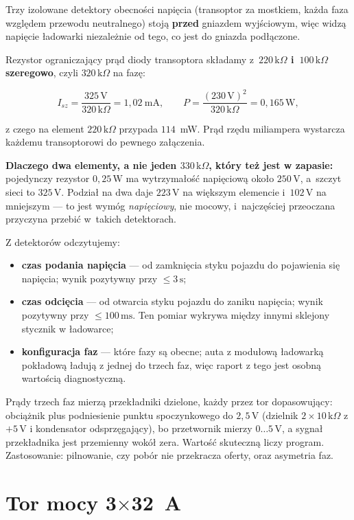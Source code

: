\documentclass[a4paper,11pt]{article}
\newcommand{\kohm}{\,\mathrm{k}\Omega}
\newcommand{\volt}{\,\mathrm{V}}
\newcommand{\watt}{\,\mathrm{W}}
\newcommand{\ms}{\,\mathrm{ms}}
\newcommand{\sek}{\,\mathrm{s}}
\begin{document}
Trzy izolowane detektory obecności napięcia (transoptor za mostkiem, każda faza
względem przewodu neutralnego) stoją \textbf{przed} gniazdem wyjściowym, więc widzą
napięcie ładowarki niezależnie od tego, co jest do gniazda podłączone.

Rezystor ograniczający prąd diody transoptora składamy z~\textbf{$220\kohm$
i~$100\kohm$ szeregowo}, czyli $320\kohm$ na fazę:

\[
I_{sz}=\frac{325\volt}{320\kohm}=1{,}02\ \mathrm{mA},
\qquad
P=\frac{(230\volt)^2}{320\kohm}=0{,}165\watt,
\]

z czego na element $220\kohm$ przypada $114$~mW. Prąd rzędu miliampera wystarcza
każdemu transoptorowi do pewnego załączenia.

\textbf{Dlaczego dwa elementy, a nie jeden $330\kohm$, który też jest w zapasie:}
pojedynczy rezystor $0{,}25\watt$ ma wytrzymałość napięciową około $250\volt$,
a~szczyt sieci to $325\volt$. Podział na dwa daje $223\volt$ na większym elemencie
i~$102\volt$ na mniejszym --- to jest wymóg \emph{napięciowy}, nie mocowy,
i~najczęściej przeoczana przyczyna przebić w~takich detektorach.

Z detektorów odczytujemy:

\begin{itemize}
\item \textbf{czas podania napięcia} --- od zamknięcia styku pojazdu do pojawienia
      się napięcia; wynik pozytywny przy $\le3\sek$;
\item \textbf{czas odcięcia} --- od otwarcia styku pojazdu do zaniku napięcia;
      wynik pozytywny przy $\le100\ms$. Ten pomiar wykrywa między innymi sklejony
      stycznik w ładowarce;
\item \textbf{konfiguracja faz} --- które fazy są obecne; auta z modułową ładowarką
      pokładową ładują z jednej do trzech faz, więc raport z tego jest osobną
      wartością diagnostyczną.
\end{itemize}

Prądy trzech faz mierzą przekładniki dzielone, każdy przez tor dopasowujący:
obciążnik plus podniesienie punktu spoczynkowego do $2{,}5\volt$ (dzielnik
$2\times10\kohm$ z $+5\volt$ i kondensator odsprzęgający), bo przetwornik mierzy
$0\ldots5\volt$, a sygnał przekładnika jest przemienny wokół zera. Wartość
skuteczną liczy program. Zastosowanie: pilnowanie, czy pobór nie przekracza oferty,
oraz asymetria faz.

\section{Tor mocy 3\texorpdfstring{$\times$}{x}32~A}
\end{document}
